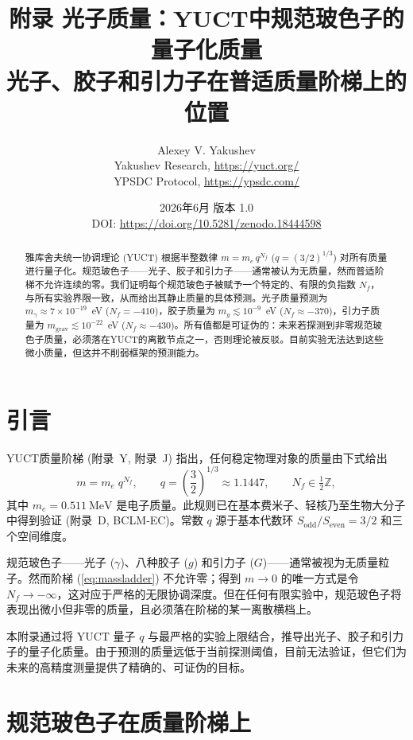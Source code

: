 \documentclass[12pt,a4paper]{article}
\title{\Huge\textbf{附录 光子质量：YUCT中规范玻色子的量子化质量}\\[0.3cm]
	\Large 光子、胶子和引力子在普适质量阶梯上的位置}
\author{Alexey V. Yakushev \\ 
	Yakushev Research, \url{https://yuct.org/} \\ 
	YPSDC Protocol, \url{https://ypsdc.com/}}
\date{2026年6月 \quad 版本 1.0 \\ \medskip
	DOI: \url{https://doi.org/10.5281/zenodo.18444598}}
\begin{document}
	
	\maketitle
	
	\begin{abstract}
		雅库舍夫统一协调理论 (YUCT) 根据半整数律 $m = m_e \, q^{N_f}$ ($q = (3/2)^{1/3}$) 对所有质量进行量子化。规范玻色子——光子、胶子和引力子——通常被认为无质量，然而普适阶梯不允许连续的零。我们证明每个规范玻色子被赋予一个特定的、有限的负指数 $N_f$，与所有实验界限一致，从而给出其静止质量的具体预测。光子质量预测为 $m_\gamma \approx 7\times 10^{-19}$~eV ($N_f = -410$)，胶子质量为 $m_g \lesssim 10^{-9}$~eV ($N_f \approx -370$)，引力子质量为 $m_{\mathrm{grav}} \lesssim 10^{-22}$~eV ($N_f \approx -430$)。所有值都是可证伪的：未来若探测到非零规范玻色子质量，必须落在YUCT的离散节点之一，否则理论被反驳。目前实验无法达到这些微小质量，但这并不削弱框架的预测能力。
	\end{abstract}
	
	\tableofcontents
	\newpage
	
	\section{引言}
	
	YUCT质量阶梯 (附录~Y, 附录~J) 指出，任何稳定物理对象的质量由下式给出
	\begin{equation}\label{eq:massladder}
		m = m_e \; q^{N_f}, \qquad q = \left(\frac{3}{2}\right)^{\!1/3} \approx 1.1447,
		\qquad N_f \in \tfrac12\mathbb{Z},
	\end{equation}
	其中 $m_e = 0.511~\mathrm{MeV}$ 是电子质量。此规则已在基本费米子、轻核乃至生物大分子中得到验证 (附录~D, BCLM‑EC)。常数 $q$ 源于基本代数环 $S_{\mathrm{odd}}/S_{\mathrm{even}} = 3/2$ 和三个空间维度。
	
	规范玻色子——光子 ($\gamma$)、八种胶子 ($g$) 和引力子 ($G$)——通常被视为无质量粒子。然而阶梯 (\ref{eq:massladder}) 不允许零；得到 $m \to 0$ 的唯一方式是令 $N_f \to -\infty$，这对应于严格的无限协调深度。但在任何有限实验中，规范玻色子将表现出微小但非零的质量，且必须落在阶梯的某一离散横档上。
	
	本附录通过将 YUCT 量子 $q$ 与最严格的实验上限结合，推导出光子、胶子和引力子的量子化质量。由于预测的质量远低于当前探测阈值，目前无法验证，但它们为未来的高精度测量提供了精确的、可证伪的目标。
	
	\section{规范玻色子在质量阶梯上}
	
\end{document}
